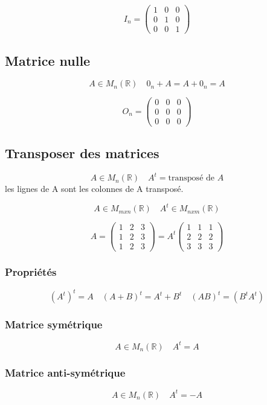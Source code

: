 \documentclass{article}
\begin{document}
\[
I_n=
  \begin{pmatrix}
    1 & 0 & 0 \\
    0 & 1 & 0 \\
    0 & 0 & 1
  \end{pmatrix}
\]


\subsection{Matrice nulle}
\[A \in M_{n}(\mathbb{R}) \quad 0_n + A = A + 0_n = A\]

\[
O_n=
  \begin{pmatrix}
    0 & 0 & 0 \\
    0 & 0 & 0 \\
    0 & 0 & 0
  \end{pmatrix}
\]

\subsection{Transposer des matrices}
\[A \in M_{n}(\mathbb{R}) \quad A^t = \text{transposé de } A \]
les lignes de A sont les colonnes de A transposé.

\[A \in M_{mxn}(\mathbb{R}) \quad A^t \in M_{nxm}(\mathbb{R})\]

\[
A=
  \begin{pmatrix}
    1 & 2 & 3 \\
    1 & 2 & 3 \\
    1 & 2 & 3
  \end{pmatrix}
= A^t
  \begin{pmatrix}
    1 & 1 & 1 \\
    2 & 2 & 2 \\
    3 & 3 & 3
  \end{pmatrix}
\]

\subsubsection{Propriétés}
\[(A^t)^t = A \quad (A + B)^t = A^t + B^t \quad (AB)^t = (B^t A^t)\]

\subsubsection{Matrice symétrique}
\[A \in M_{n}(\mathbb{R}) \quad A^t = A\]

\subsubsection{Matrice anti-symétrique}
\[A \in M_{n}(\mathbb{R}) \quad A^t = -A\]
\end{document}
